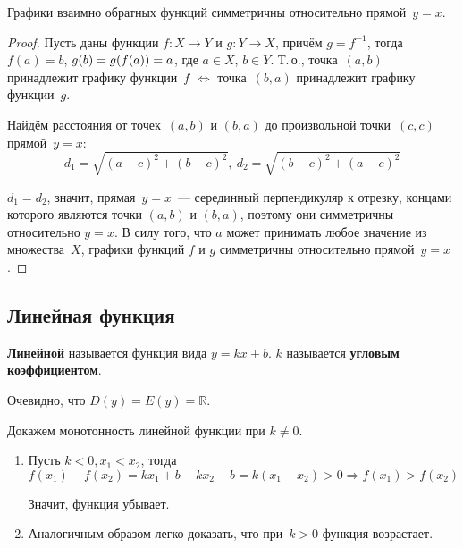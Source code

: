 \begin{theorem}
Графики взаимно обратных функций симметричны относительно прямой~$y = x$.
\end{theorem}
\begin{proof}
Пусть даны функции $f \colon X \to Y$ и $g \colon Y \to X$, причём $g = f^{-1}$, тогда $f(a) = b$, $g(b) \opbr= g(f(a)) \opbr= a$, где $a \in X$, $b \in Y$.
Т.\,о., точка~$(a, b)$ принадлежит графику функции~$f$ $\Leftrightarrow$ точка~$(b, a)$ принадлежит графику функции~$g$.

Найдём расстояния от точек~$(a, b)$ и $(b, a)$ до произвольной точки~$(c, c)$ прямой~$y = x$:
\begin{equation*}
d_1 = \sqrt{(a - c)^2 + (b - c)^2}, \
d_2 = \sqrt{(b - c)^2 + (a - c)^2}
\end{equation*}

$d_1 = d_2$, значит, прямая~$y = x$~--- серединный перпендикуляр к отрезку, концами которого являются точки $(a, b)$ и $(b, a)$, поэтому они симметричны относительно $y = x$.
В силу того, что $a$ может принимать любое значение из множества~$X$, графики функций $f$ и $g$ симметричны относительно прямой~$y = x$.
\end{proof}

\subsection{Линейная функция}
 \textbf{Линейной} называется функция вида $y = kx + b$.
$k$ называется \textbf{угловым коэффициентом}.

Очевидно, что $D(y) = E(y) = \mathbb R$.

Докажем монотонность линейной функции при $k \neq 0$.
\begin{enumerate}
	\item Пусть $k < 0, x_1 < x_2$, тогда
	\begin{equation*}
	f(x_1) - f(x_2) =
	k x_1 + b - k x_2 - b =
	k(x_1 - x_2) > 0 \Rightarrow
	f(x_1) > f(x_2)
	\end{equation*}
	
	Значит, функция убывает.
	
	\item Аналогичным образом легко доказать, что при~$k > 0$ функция возрастает.
\end{enumerate}

